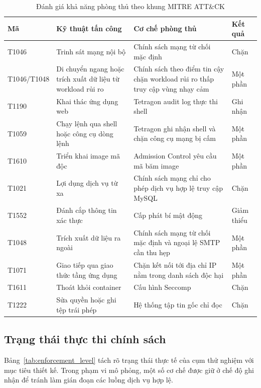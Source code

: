 \begin{table}[H]
\centering
\caption{Đánh giá khả năng phòng thủ theo khung MITRE ATT\&CK}
\label{tab:c3_mitre_summary}
\renewcommand{\arraystretch}{1.25}
\footnotesize
\TableRiskColors
\begin{tabularx}{\textwidth}{|L{1.7cm}|Y|Y|L{2.2cm}|}
\hline
{}
\textbf{Mã} & \textbf{Kỹ thuật tấn công} & \textbf{Cơ chế phòng thủ} & \textbf{Kết quả} \\
\hline
T1046 & Trinh sát mạng nội bộ & Chính sách mạng từ chối mặc định & Chặn \\
\hline
T1046/T1048 & Di chuyển ngang hoặc trích xuất dữ liệu từ workload rủi ro & Chính sách theo điểm tin cậy chặn workload rủi ro thấp truy cập vùng nhạy cảm & Một phần \\
\hline
T1190 & Khai thác ứng dụng web & Tetragon audit log thực thi shell & Ghi nhận \\
\hline
T1059 & Chạy lệnh qua shell hoặc công cụ dòng lệnh & Tetragon ghi nhận shell và chặn công cụ mạng bị cấm & Một phần \\
\hline
T1610 & Triển khai image mã độc & Admission Control yêu cầu mã băm image & Một phần \\
\hline
T1021 & Lợi dụng dịch vụ từ xa & Chính sách mạng chỉ cho phép dịch vụ hợp lệ truy cập MySQL & Chặn \\
\hline
T1552 & Đánh cắp thông tin xác thực & Cấp phát bí mật động & Giảm thiểu \\
\hline
T1048 & Trích xuất dữ liệu ra ngoài & Chính sách mạng từ chối mặc định và ngoại lệ SMTP cần thu hẹp & Một phần \\
\hline
T1071 & Giao tiếp qua giao thức tầng ứng dụng & Chặn kết nối tới địa chỉ IP nằm trong danh sách độc hại & Một phần \\
\hline
T1611 & Thoát khỏi container & Cấu hình Seccomp & Chặn \\
\hline
T1222 & Sửa quyền hoặc ghi tệp trái phép & Hệ thống tập tin gốc chỉ đọc & Chặn \\
\hline
\end{tabularx}
\end{table}

\subsection{Trạng thái thực thi chính sách}

Bảng~\ref{tab:enforcement_level} tách rõ trạng thái thực tế của cụm thử nghiệm với mục tiêu thiết kế. Trong phạm vi mô phỏng, một số cơ chế được giữ ở chế độ ghi nhận để tránh làm gián đoạn các luồng dịch vụ hợp lệ.

